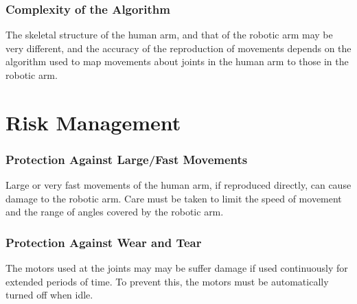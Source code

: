 \documentclass[a4wide]{scrreprt}
\begin{document}
\subsection*{Complexity of the Algorithm}
The skeletal structure of the human arm, and that of the robotic arm may be very different, and the accuracy of the reproduction of movements depends on the algorithm used to map movements about joints in the human arm to those in the robotic arm.
\chapter{Risk Management}
\subsection*{Protection Against Large/Fast Movements}
Large or very fast movements of the human arm, if reproduced directly, can cause damage to the robotic arm. Care must be taken to limit the speed of movement and the range of angles covered by the robotic arm.

\subsection*{Protection Against Wear and Tear}
The motors used at the joints may may be suffer damage if used continuously for extended periods of time. To prevent this, the motors must be automatically turned off when idle. 
\end{document}
